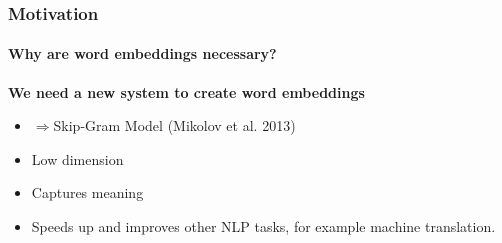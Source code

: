 \begin{frame}\frametitle {Motivation}
    \framesubtitle{Why are word embeddings necessary?}
    \textbf{We need a new system to create word embeddings }
      \begin{itemize}
 \item $\Rightarrow $Skip-Gram Model  (Mikolov et al. 2013) \cite{mikolov}
 \item Low dimension
 \item Captures meaning
 \item Speeds up and improves other NLP tasks, for example machine translation. 
 \end{itemize}
  \end{frame}
  \fi

